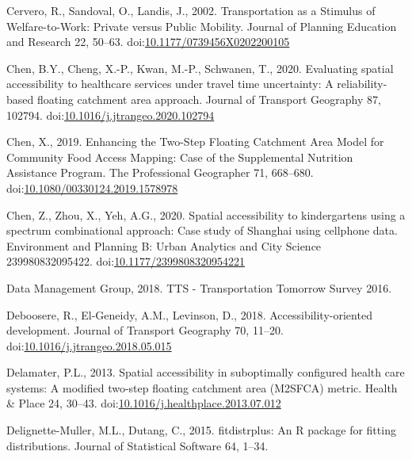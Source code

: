 \documentclass[]{elsarticle} %
\newlength{\cslhangindent}
\newlength{\cslentryspacingunit} %
\newenvironment{CSLReferences}[2] %
 {%
  \setlength{\parindent}{0pt}
  \ifodd #1
  \let\oldpar\par
  \def\par{\hangindent=\cslhangindent\oldpar}
  \fi
  \setlength{\parskip}{#2\cslentryspacingunit}
 }%
 {}
\begin{document}
\begin{CSLReferences}{1}{0}
\leavevmode{}%
Cervero, R., Sandoval, O., Landis, J., 2002. Transportation as a
{Stimulus} of {Welfare}-to-{Work}: {Private} versus {Public} {Mobility}.
Journal of Planning Education and Research 22, 50--63.
doi:\href{https://doi.org/10.1177/0739456X0202200105}{10.1177/0739456X0202200105}

\leavevmode{}%
Chen, B.Y., Cheng, X.-P., Kwan, M.-P., Schwanen, T., 2020. Evaluating
spatial accessibility to healthcare services under travel time
uncertainty: {A} reliability-based floating catchment area approach.
Journal of Transport Geography 87, 102794.
doi:\href{https://doi.org/10.1016/j.jtrangeo.2020.102794}{10.1016/j.jtrangeo.2020.102794}

\leavevmode{}%
Chen, X., 2019. Enhancing the {Two}-{Step} {Floating} {Catchment} {Area}
{Model} for {Community} {Food} {Access} {Mapping}: {Case} of the
{Supplemental} {Nutrition} {Assistance} {Program}. The Professional
Geographer 71, 668--680.
doi:\href{https://doi.org/10.1080/00330124.2019.1578978}{10.1080/00330124.2019.1578978}

\leavevmode{}%
Chen, Z., Zhou, X., Yeh, A.G., 2020. Spatial accessibility to
kindergartens using a spectrum combinational approach: {Case} study of
{Shanghai} using cellphone data. Environment and Planning B: Urban
Analytics and City Science 239980832095422.
doi:\href{https://doi.org/10.1177/2399808320954221}{10.1177/2399808320954221}

\leavevmode{}%
Data Management Group, 2018. {TTS} - {Transportation} {Tomorrow}
{Survey} 2016.

\leavevmode{}%
Deboosere, R., El-Geneidy, A.M., Levinson, D., 2018.
Accessibility-oriented development. Journal of Transport Geography 70,
11--20.
doi:\href{https://doi.org/10.1016/j.jtrangeo.2018.05.015}{10.1016/j.jtrangeo.2018.05.015}

\leavevmode{}%
Delamater, P.L., 2013. Spatial accessibility in suboptimally configured
health care systems: A modified two-step floating catchment area
(M2SFCA) metric. Health \& Place 24, 30--43.
doi:\href{https://doi.org/10.1016/j.healthplace.2013.07.012}{10.1016/j.healthplace.2013.07.012}

\leavevmode{}%
Delignette-Muller, M.L., Dutang, C., 2015. {fitdistrplus}: An {R}
package for fitting distributions. Journal of Statistical Software 64,
1--34.


\end{CSLReferences}
\end{document}
